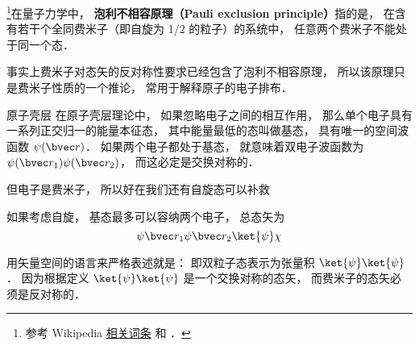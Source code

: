 
\footnote{参考 Wikipedia \href{https://en.wikipedia.org/wiki/Pauli_exclusion_principle}{相关词条} 和 \cite{GriffQ}．}在量子力学中， \textbf{泡利不相容原理（Pauli exclusion principle）}指的是， 在含有若干个全同费米子（即自旋为 1/2 的粒子）的系统中， 任意两个费米子不能处于同一个态．

事实上费米子对态矢的反对称性要求已经包含了泡利不相容原理， 所以该原理只是费米子性质的一个推论， 常用于解释原子的电子排布．

\begin{example}{原子壳层}
在原子壳层理论中， 如果忽略电子之间的相互作用， 那么单个电子具有一系列正交归一的能量本征态， 其中能量最低的态叫做基态， 具有唯一的空间波函数 $\psi(\bvec r)$． 如果两个电子都处于基态， 就意味着双电子波函数为 $\psi(\bvec r_1)\psi(\bvec r_2)$， 而这必定是交换对称的．

但电子是费米子， 所以好在我们还有自旋态可以补救


 如果考虑自旋， 基态最多可以容纳两个电子， 总态矢为
$$
\psi{\bvec r_1}\psi{\bvec r_2}\ket{\psi}\chi
$$
\end{example}

用矢量空间的语言来严格表述就是： 即双粒子态表示为张量积 $\ket{\psi}\ket{\psi}$． 因为根据定义 $\ket{\psi}\ket{\psi}$ 是一个交换对称的态矢， 而费米子的态矢必须是反对称的．
